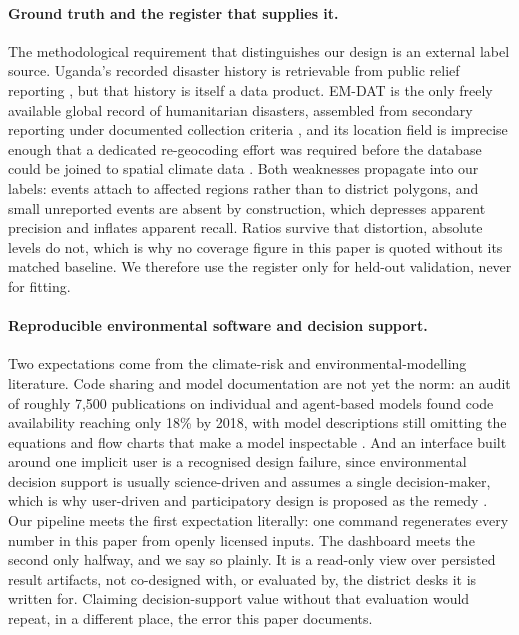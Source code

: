 \documentclass[preprint,12pt]{elsarticle}
\begin{document}
\paragraph{Ground truth and the register that supplies it.}
The methodological requirement that distinguishes our design is an external
label source. Uganda's recorded disaster history is retrievable from public
relief reporting \cite{unma2022,emdat2023,fewsnet2021}, but that history is
itself a data product. EM-DAT is the only freely available global record of
humanitarian disasters, assembled from secondary reporting under documented
collection criteria \cite{delforge2025,emdatdoc}, and its location field is
imprecise enough that a dedicated re-geocoding effort was required before the
database could be joined to spatial climate data \cite{teber2025}. Both
weaknesses propagate into our labels: events attach to affected regions rather
than to district polygons, and small unreported events are absent by
construction, which depresses apparent precision and inflates apparent recall.
Ratios survive that distortion, absolute levels do not, which is why no
coverage figure in this paper is quoted without its matched baseline. We
therefore use the register only for held-out validation, never for fitting.

\paragraph{Reproducible environmental software and decision support.}
Two expectations come from the climate-risk and environmental-modelling literature. Code sharing and model
documentation are not yet the norm: an audit of roughly 7{,}500 publications on
individual and agent-based models found code availability reaching only 18\% by
2018, with model descriptions still omitting the equations and flow charts that
make a model inspectable \cite{janssen2020}. And an interface built around one
implicit user is a recognised design failure, since environmental decision
support is usually science-driven and assumes a single decision-maker, which is
why user-driven and participatory design is proposed as the remedy
\cite{zulkafli2017}. Our pipeline meets the first expectation literally: one
command regenerates every number in this paper from openly licensed inputs. The
dashboard meets the second only halfway, and we say so plainly. It is a
read-only view over persisted result artifacts, not co-designed with, or
evaluated by, the district desks it is written for. Claiming decision-support
value without that evaluation would repeat, in a different place, the error this
paper documents.
\end{document}
